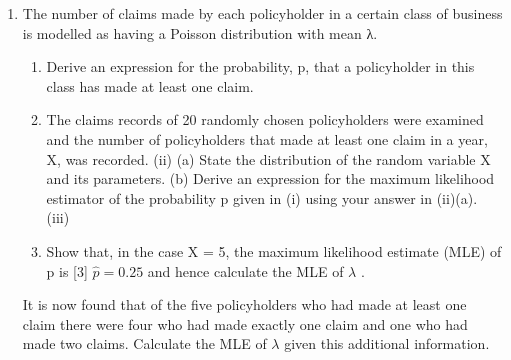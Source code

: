 \documentclass[a4paper,12pt]{article}
\begin{document}
\begin{enumerate}
\item
The number of claims made by each policyholder in a certain class of business is
modelled as having a Poisson distribution with mean λ.

\begin{enumerate}
\item Derive an expression for the probability, p, that a policyholder in this class has made at least one claim.
\item The claims records of 20 randomly chosen policyholders were examined and the number of policyholders that made at least one claim in a year, X, was recorded.
(ii)
(a) State the distribution of the random variable X and its parameters.
(b) Derive an expression for the maximum likelihood estimator of the
probability p given in (i) using your answer in (ii)(a).
(iii)
\item Show that, in the case X = 5, the maximum likelihood estimate (MLE) of p is
[3]
$\hat{p} = 0.25$ and hence calculate the MLE of $\lambda$ .
\end{enumerate}
It is now found that of the five policyholders who had made at least one claim there were four who had made exactly one claim and one who had made two claims.
Calculate the MLE of $\lambda$ given this additional information.
\end{enumerate}

\newpage
\end{document}
